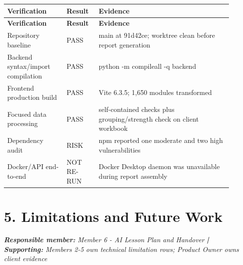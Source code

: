 \documentclass[11pt,a4paper]{article}
\begin{document}
\begin{small}

\setlength{\tabcolsep}{3pt}

\begin{longtable}{>{\raggedright\arraybackslash}p{0.241\linewidth}>{\raggedright\arraybackslash}p{0.133\linewidth}>{\raggedright\arraybackslash}p{0.546\linewidth}}

\hline

\textbf{Verification} & \textbf{Result} & \textbf{Evidence} \\ \hline

\endfirsthead

\hline

\textbf{Verification} & \textbf{Result} & \textbf{Evidence} \\ \hline

\endhead

Repository baseline & PASS & main at 91d42ce; worktree clean before report generation \\ \hline

Backend syntax/\allowbreak{}import compilation & PASS & python -m compileall -q backend \\ \hline

Frontend production build & PASS & Vite 6.3.5; 1,650 modules transformed \\ \hline

Focused data processing & PASS & 12 self-contained checks plus grouping/\allowbreak{}strength check on client workbook \\ \hline

Dependency audit & RISK & npm reported one moderate and two high vulnerabilities \\ \hline

Docker/\allowbreak{}API end-to-end & NOT RE-RUN & Docker Desktop daemon was unavailable during report assembly \\ \hline

\end{longtable}

\end{small}

\section*{5. Limitations and Future Work}


\noindent\textit{\textbf{Responsible member: }Member 6 - AI Lesson Plan and Handover\textbf{ | Supporting: }Members 2-5 own technical limitation rows; Product Owner owns client evidence}\par
\end{document}

